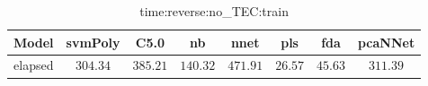 \begin{table}[!ht]
	\centering
	\begin{tabular}{|c|c|c|c|c|c|c|c|}
		\hline
		Model & svmPoly & C5.0 & nb & nnet & pls & fda & pcaNNet \\ \hline
		elapsed & $304.34$ & $385.21$ & $140.32$ & $471.91$ & $26.57$ & $45.63$ & $311.39$ \\ \hline
	\end{tabular}
	\caption{time:reverse:no_TEC:train}
	\label{tab:time:reverse:no_TEC:train}
\end{table}
